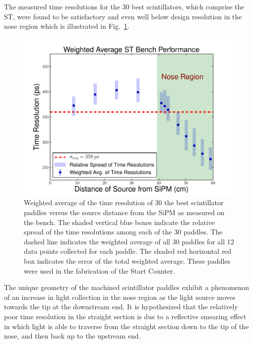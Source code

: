 The measured time resolutions for the 30 best scintillators, which comprise the ST, were found to be satisfactory and even well below design resolution in the nose region which is illustrated in Fig.~\ref{fig:time_res_comp_final_30}.
	\begin{figure}[!htb]
	\centering
	\includegraphics[width=1.0\columnwidth]{fabrication/figs/wtr_vs_dist_v2}
	\caption{Weighted average of the time resolution of 30 the best scintillator paddles versus the source distance from the SiPM as measured on the bench.  The shaded vertical blue boxes indicate the relative spread of the time resolutions among each of the 30 paddles.  The dashed line indicates the weighted average of all 30 paddles for all 12 data points collected for each paddle.  The shaded red horizontal red box indicates the error of the total weighted average.  These paddles were used in the fabrication of the Start Counter.}
	\label{fig:time_res_comp_final_30}
	\end{figure}

The unique geometry of the machined scintillator paddles exhibit a phenomenon of an increase in light collection in the nose region as the light source moves towards the tip at the downstream end.  It is hypothesized that the relatively poor time resolution in the straight section is due to a reflective smearing effect in which light is able to traverse from the straight section down to the tip of the nose, and then back up to the upstream end.

